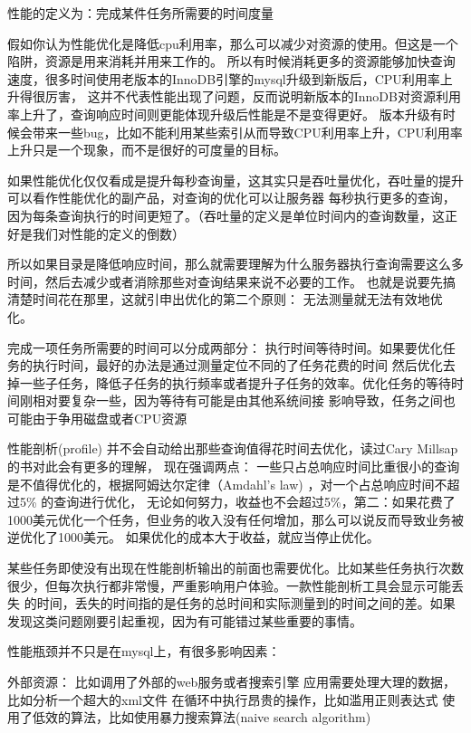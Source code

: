 
性能的定义为：完成某件任务所需要的时间度量

假如你认为性能优化是降低cpu利用率，那么可以减少对资源的使用。但这是一个陷阱，资源是用来消耗并用来工作的。
所以有时候消耗更多的资源能够加快查询速度，很多时间使用老版本的InnoDB引擎的mysql升级到新版后，CPU利用率上升得很厉害，
这并不代表性能出现了问题，反而说明新版本的InnoDB对资源利用率上升了，查询响应时间则更能体现升级后性能是不是变得更好。
版本升级有时候会带来一些bug，比如不能利用某些索引从而导致CPU利用率上升，CPU利用率上升只是一个现象，而不是很好的可度量的目标。

如果性能优化仅仅看成是提升每秒查询量，这其实只是吞吐量优化，吞吐量的提升可以看作性能优化的副产品，对查询的优化可以让服务器
每秒执行更多的查询，因为每条查询执行的时间更短了。（吞吐量的定义是单位时间内的查询数量，这正好是我们对性能的定义的倒数）

所以如果目录是降低响应时间，那么就需要理解为什么服务器执行查询需要这么多时间，然后去减少或者消除那些对查询结果来说不必要的工作。
也就是说要先搞清楚时间花在那里，这就引申出优化的第二个原则： 无法测量就无法有效地优化。



完成一项任务所需要的时间可以分成两部分： 执行时间等待时间。如果要优化任务的执行时间，最好的办法是通过测量定位不同的了任务花费的时间
然后优化去掉一些子任务，降低子任务的执行频率或者提升子任务的效率。优化任务的等待时间刚相对要复杂一些，因为等待有可能是由其他系统间接
影响导致，任务之间也可能由于争用磁盘或者CPU资源


性能剖析(profile) 并不会自动给出那些查询值得花时间去优化，读过Cary Millsap的书对此会有更多的理解，
现在强调两点： 一些只占总响应时间比重很小的查询是不值得优化的，根据阿姆达尔定律（Amdahl's law) ，对一个占总响应时间不超过5\% 的查询进行优化，
无论如何努力，收益也不会超过5\%，第二：如果花费了1000美元优化一个任务，但业务的收入没有任何增加，那么可以说反而导致业务被逆优化了1000美元。
如果优化的成本大于收益，就应当停止优化。

某些任务即使没有出现在性能剖析输出的前面也需要优化。比如某些任务执行次数很少，但每次执行都非常慢，严重影响用户体验。一款性能剖析工具会显示可能丢失
的时间，丢失的时间指的是任务的总时间和实际测量到的时间之间的差。如果发现这类问题刚要引起重视，因为有可能错过某些重要的事情。

性能瓶颈并不只是在mysql上，有很多影响因素：

外部资源： 比如调用了外部的web服务或者搜索引擎
应用需要处理大理的数据，比如分析一个超大的xml文件
在循环中执行昂贵的操作，比如滥用正则表达式
使用了低效的算法，比如使用暴力搜索算法(naive search algorithm)

